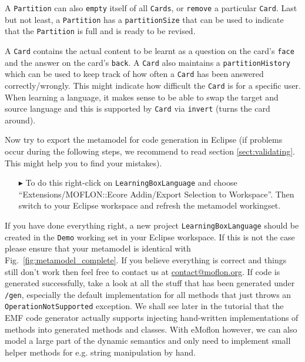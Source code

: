 A \texttt{Partition} can also \texttt{empty} itself of all \texttt{Cards}, or \texttt{remove} a particular \texttt{Card}.
Last but not least, a \texttt{Partition} has a \texttt{partitionSize} that can be used to indicate that the \texttt{Partition} is full and is ready to be revised.

A \texttt{Card} contains the actual content to be learnt as a question on the card's \texttt{face} and the answer on the card's \texttt{back}.
A \texttt{Card} also maintains a \texttt{partition\-History} which can be used to keep track of how often a \texttt{Card} has been answered correctly/wrongly.
This might indicate how difficult the \texttt{Card} is for a specific user.
When learning a language, it makes sense to be able to swap the target and source language and this is supported by \texttt{Card} via \texttt{invert} (turns the card around).

Now try to export the metamodel for code generation in Eclipse (if problems occur during the following steps, we recommend to read section \ref{sect:validating}. This might help you to find your mistakes).

\begin{enumerate}
\item[$\blacktriangleright$] To do this right-click on \texttt{LearningBoxLanguage} and choose ``Extensions/MOFLON::Ecore Addin/Export Selection to Workspace''.
Then switch to your Eclipse work\-space and refresh the metamodel workingset.
\end{enumerate}


If you have done everything right, a new project \texttt{LearningBoxLanguage} should be created in the \texttt{Demo} working set in your Eclipse workspace.
If this is not the case please ensure that your metamodel is identical with Fig.~\ref{fig:metamodel_complete}.
If you believe everything is correct and things still don't work then feel free to contact us at \href{mailto:contact@moflon.org}{contact@moflon.org}.
If code is generated successfully, take a look at all the stuff that has been generated under \texttt{/gen}, especially the default  implementation for all methods that just throws an  \texttt{OperationNotSupported} exception.
We shall see later in the tutorial that the EMF code generator actually supports injecting hand-written implementations of methods into generated methods and classes.
With eMoflon however, we can also model a large part of the dynamic semantics and only need to implement small helper methods for e.g. string manipulation by hand.

